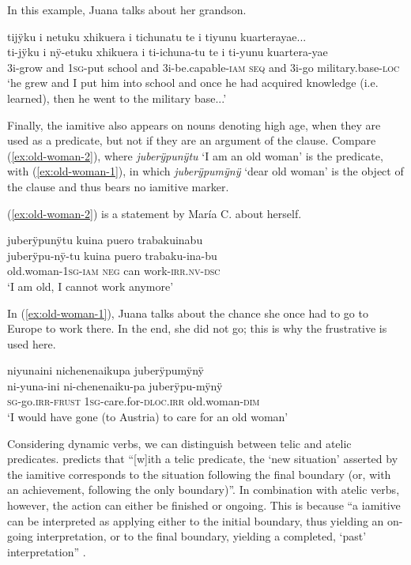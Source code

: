 In this example, Juana talks about her grandson.

\ea\label{ex:know-cos}
\begingl 
\glpreamble tijÿku i netuku xhikuera i tichunatu te i tiyunu kuarterayae...\\
\gla ti-jÿku i nÿ-etuku xhikuera i ti-ichuna-tu te i ti-yunu kuartera-yae\\ 
\glb 3i-grow and 1\textsc{sg}-put school and 3i-be.capable-\textsc{iam} \textsc{seq} and 3i-go military.base-\textsc{loc}\\ 
\glft ‘he grew and I put him into school and once he had acquired knowledge (i.e. learned), then he went to the military base...’
\trailingcitation{[jxx-p110923l-1.173-176]}
\xe

Finally, the iamitive also appears on nouns denoting high age, when they are used as a predicate, but not if they are an argument of the clause. Compare (\ref{ex:old-woman-2}), where \textit{juberÿpu\-nÿtu} ‘I am an old woman’ is the predicate, with (\ref{ex:old-woman-1}), in which \textit{juberÿpu\-mÿnÿ} ‘dear old woman’ is the object of the clause and thus bears no iamitive marker.


(\ref{ex:old-woman-2}) is a statement by María C. about herself.

\ea\label{ex:old-woman-2}
\begingl 
\glpreamble juberÿpunÿtu kuina puero trabakuinabu\\
\gla juberÿpu-nÿ-tu kuina puero trabaku-ina-bu\\ 
\glb old.woman-1\textsc{sg}-\textsc{iam} \textsc{neg} can work-\textsc{irr.nv}-\textsc{dsc}\\ 
\glft ‘I am old, I cannot work anymore’
\trailingcitation{[uxx-p110825l.203]}
\xe

In (\ref{ex:old-woman-1}), Juana talks about the chance she once had to go to Europe to work there. In the end, she did not go; this is why the frustrative is used here.

\ea\label{ex:old-woman-1}
\begingl 
\glpreamble niyunaini nichenenaikupa juberÿpumÿnÿ\\
\gla ni-yuna-ini ni-chenenaiku-pa juberÿpu-mÿnÿ\\ 
\textsc{sg}-go.\textsc{irr}-\textsc{frust} 1\textsc{sg}-care.for-\textsc{dloc.irr} old.woman-\textsc{dim}\\ 
\glft ‘I would have gone (to Austria) to care for an old woman’
\trailingcitation{[jxx-e120516l-1.015]}
\xe


Considering dynamic verbs, we can distinguish between telic and atelic predicates. \citet[19]{Olsson2013} predicts that “[w]ith a telic predicate, the ‘new situation’ asserted by the iamitive corresponds to the situation following the final boundary (or, with an achievement, following the only boundary)”. In combination with atelic verbs, however, the action can either be finished or ongoing. This is because “a iamitive can be interpreted as applying either to the initial boundary, thus yielding an on-going interpretation, or to the final boundary, yielding a completed, ‘past’ interpretation” \citep[19]{Olsson2013}. 

